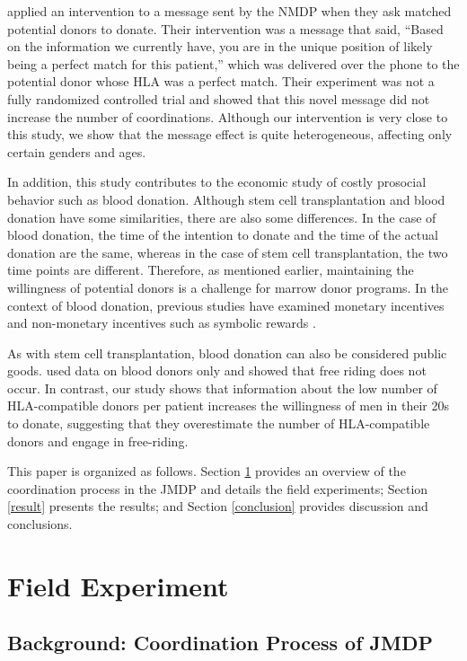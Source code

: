 \documentclass[
]{article}
\begin{document}
\citet{Switzer2018} applied an intervention to a message sent by the NMDP when they ask matched potential donors to donate. Their intervention was a message that said, ``Based on the information we currently have, you are in the unique position of likely being a perfect match for this patient,'' which was delivered over the phone to the potential donor whose HLA was a perfect match. Their experiment was not a fully randomized controlled trial and showed that this novel message did not increase the number of coordinations. Although our intervention is very close to this study, we show that the message effect is quite heterogeneous, affecting only certain genders and ages.

In addition, this study contributes to the economic study of costly prosocial behavior such as blood donation. Although stem cell transplantation and blood donation have some similarities, there are also some differences. In the case of blood donation, the time of the intention to donate and the time of the actual donation are the same, whereas in the case of stem cell transplantation, the two time points are different. Therefore, as mentioned earlier, maintaining the willingness of potential donors is a challenge for marrow donor programs. In the context of blood donation, previous studies have examined monetary incentives and non-monetary incentives such as symbolic rewards \citep{Mellstrom2008, Lacetera2010}.

As with stem cell transplantation, blood donation can also be considered public goods. \citet{Wildman2009} used data on blood donors only and showed that free riding does not occur. In contrast, our study shows that information about the low number of HLA-compatible donors per patient increases the willingness of men in their 20s to donate, suggesting that they overestimate the number of HLA-compatible donors and engage in free-riding.

This paper is organized as follows. Section \ref{experiment} provides an overview of the coordination process in the JMDP and details the field experiments; Section \ref{result} presents the results; and Section \ref{conclusion} provides discussion and conclusions.

\hypertarget{experiment}{%
\section{Field Experiment}\label{experiment}}

\hypertarget{background}{%
\subsection{Background: Coordination Process of JMDP}\label{background}}
\end{document}
